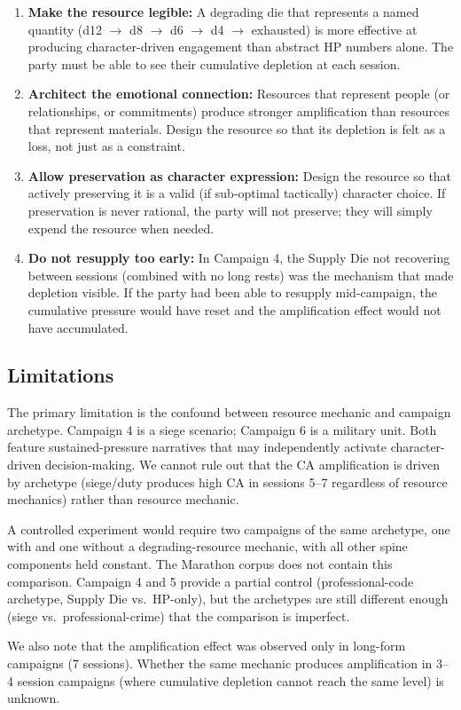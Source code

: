 \begin{enumerate}
  \item \textbf{Make the resource legible:} A degrading die that represents a named
    quantity (d12 $\to$ d8 $\to$ d6 $\to$ d4 $\to$ exhausted) is more effective at
    producing character-driven engagement than abstract HP numbers alone. The party
    must be able to see their cumulative depletion at each session.

  \item \textbf{Architect the emotional connection:} Resources that represent people
    (or relationships, or commitments) produce stronger amplification than resources
    that represent materials. Design the resource so that its depletion is felt as
    a loss, not just as a constraint.

  \item \textbf{Allow preservation as character expression:} Design the resource so
    that actively preserving it is a valid (if sub-optimal tactically) character choice.
    If preservation is never rational, the party will not preserve; they will simply
    expend the resource when needed.

  \item \textbf{Do not resupply too early:} In Campaign 4, the Supply Die not recovering
    between sessions (combined with no long rests) was the mechanism that made depletion
    visible. If the party had been able to resupply mid-campaign, the cumulative
    pressure would have reset and the amplification effect would not have accumulated.
\end{enumerate}

\subsection{Limitations}

The primary limitation is the confound between resource mechanic and campaign archetype.
Campaign 4 is a siege scenario; Campaign 6 is a military unit. Both feature sustained-pressure
narratives that may independently activate character-driven decision-making. We cannot
rule out that the CA amplification is driven by archetype (siege/duty produces high CA
in sessions 5--7 regardless of resource mechanics) rather than resource mechanic.

A controlled experiment would require two campaigns of the same archetype, one with
and one without a degrading-resource mechanic, with all other spine components held
constant. The Marathon corpus does not contain this comparison. Campaign 4 and 5
provide a partial control (professional-code archetype, Supply Die vs.\ HP-only),
but the archetypes are still different enough (siege vs.\ professional-crime) that
the comparison is imperfect.

We also note that the amplification effect was observed only in long-form campaigns
(7 sessions). Whether the same mechanic produces amplification in 3--4 session
campaigns (where cumulative depletion cannot reach the same level) is unknown.
